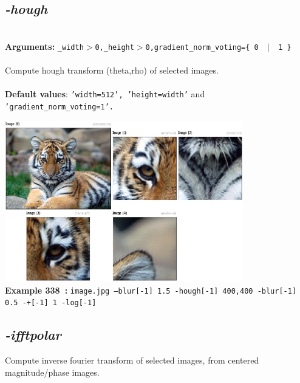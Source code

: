 \documentclass[a4paper,11pt,twoside]{book}
\begin{document}
\subsection{\emph{-hough} }\vspace*{-0.5em}
~\\\textbf{Arguments: } 
{\small \texttt{\_width$>$0,\_height$>$0,gradient\_norm\_voting=\{ 0 ~$|$~ 1 \}}}\\~\\
Compute hough transform (theta,rho) of selected images.
~\\~\\\textbf{Default values}: {\small \texttt{'width=512', 'height=width'} and \texttt{'gradient\_norm\_voting=1'.}}
\begin{center}\includegraphics[keepaspectratio=true,height=7cm,width=\textwidth]{img/gmic_def338.jpg}\\
{\footnotesize \textbf{Example 338~:} \texttt{image.jpg --blur[-1] 1.5 -hough[-1] 400,400 -blur[-1] 0.5 -+[-1] 1 -log[-1]}}
\end{center}

\subsection{\emph{-ifftpolar} }\vspace*{-0.5em}
Compute inverse fourier transform of selected images, from centered magnitude/phase images.
\end{document}
